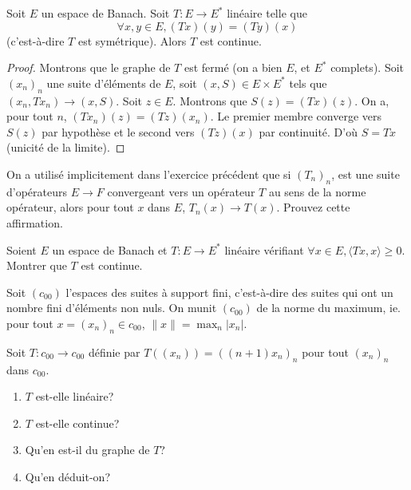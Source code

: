 \begin{prop}
  Soit $E$ un espace de Banach. Soit $T: E\to E^*$ linéaire
  telle que
  $$\forall x, y \in E, (Tx)(y) = (Ty)(x)$$
  (c'est-à-dire $T$ est symétrique). Alors $T$ est continue.
\end{prop}

\begin{proof}
  Montrons que le graphe de $T$ est fermé (on a bien $E$, et $E^*$
  complets). Soit $(x_n)_n$ une suite d'éléments de $E$, soit
  $(x, S)\in E \times E^*$ tels que $(x_n, Tx_n)\to (x, S)$.
  Soit $z\in E$. Montrons que $S(z) = (Tx)(z)$.
  On a, pour tout $n$, $(Tx_n)(z) = (Tz)(x_n)$. Le premier
  membre converge vers $S(z)$ par hypothèse et le second
  vers $(Tz)(x)$ par continuité. D'où $S = Tx$ (unicité
  de la limite).
\end{proof}

\begin{exo}
  On a utilisé implicitement dans l'exercice précédent
  que si $(T_n)_n$, est une suite d'opérateurs $E\to F$ convergeant
  vers un opérateur $T$ au sens de la norme opérateur,
  alors pour tout $x$ dans $E$, $T_n(x) \to T(x)$. Prouvez
  cette affirmation.
\end{exo}

\begin{exo}
  Soient $E$ un espace de Banach et $T: E\to E^*$ linéaire vérifiant
  $\forall x\in E, \langle Tx, x\rangle\geq 0$. Montrer que $T$
  est continue.
\end{exo}


\begin{exo}
  Soit $(c_{00})$ l'espaces des suites à support fini, c'est-à-dire
  des suites qui ont un nombre fini d'éléments non nuls. On munit
  $(c_{00})$ de la norme du maximum, ie. pour tout $x=(x_n)_n\in c_{00}$,
  $\|x\| = \max_{n}|x_n|$.

  Soit $T:c_{00}\to c_{00}$ définie par $T((x_n)) = ((n+1)x_n)_n$
  pour tout $(x_n)_n$ dans $c_{00}$.
  \begin{enumerate}
  \item $T$ est-elle linéaire?
  \item $T$ est-elle continue?
  \item Qu'en est-il du graphe de $T$?
  \item Qu'en déduit-on?
  \end{enumerate}
\end{exo}

